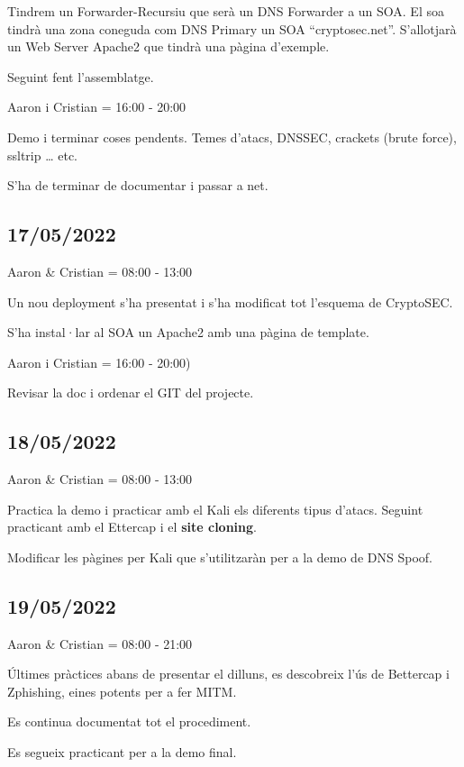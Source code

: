 \documentclass[]{article}
\begin{document}
Tindrem un Forwarder-Recursiu que serà un DNS Forwarder a un SOA. El soa
tindrà una zona coneguda com DNS Primary un SOA ``cryptosec.net''.
S'allotjarà un Web Server Apache2 que tindrà una pàgina d'exemple.

Seguint fent l'assemblatge.

Aaron i Cristian = 16:00 - 20:00

Demo i terminar coses pendents. Temes d'atacs, DNSSEC, crackets (brute
force), ssltrip \ldots{} etc.

S'ha de terminar de documentar i passar a net.

\hypertarget{section-17}{%
\subsection{17/05/2022}\label{section-17}}

Aaron \& Cristian = 08:00 - 13:00

Un nou deployment s'ha presentat i s'ha modificat tot l'esquema de
CryptoSEC.

S'ha instal·lar al SOA un Apache2 amb una pàgina de template.

Aaron i Cristian = 16:00 - 20:00)

Revisar la doc i ordenar el GIT del projecte.

\hypertarget{section-18}{%
\subsection{18/05/2022}\label{section-18}}

Aaron \& Cristian = 08:00 - 13:00

Practica la demo i practicar amb el Kali els diferents tipus d'atacs.
Seguint practicant amb el Ettercap i el \textbf{site cloning}.

Modificar les pàgines per Kali que s'utilitzaràn per a la demo de DNS
Spoof.

\hypertarget{section-19}{%
\subsection{19/05/2022}\label{section-19}}

Aaron \& Cristian = 08:00 - 21:00

Últimes pràctices abans de presentar el dilluns, es descobreix l'ús de
Bettercap i Zphishing, eines potents per a fer MITM.

Es continua documentat tot el procediment.

Es segueix practicant per a la demo final.
\end{document}
